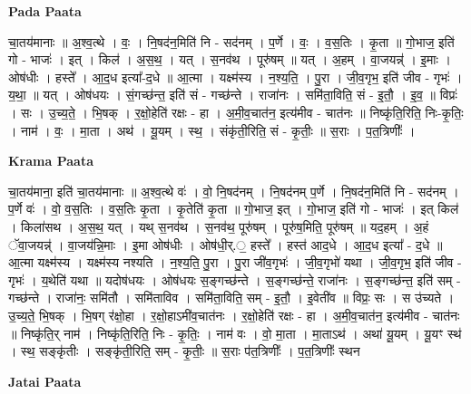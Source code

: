 \documentclass[17pt]{extarticle}
\begin{document}
\textbf{Pada Paata} \newline

चा॒तय॑मानाः ॥ अ॒श्व॒त्थे । वः॒ । नि॒षद॑न॒मिति॑ नि - सद॑नम् । प॒र्णे । वः॒ । व॒स॒तिः । कृ॒ता ॥ गो॒भाज॒ इति॑ गो - भाजः॑ । इत् । किल॑ । अ॒स॒थ॒ । यत् । स॒नव॑थ । पूरु॑षम् ॥ यत् । अ॒हम् । वा॒जयन्न्॑ । इ॒माः । ओष॑धीः । हस्ते᳚ । आ॒द॒ध इत्या᳚-द॒धे ॥ आ॒त्मा । यक्ष्म॑स्य । न॒श्य॒ति॒ । पु॒रा । जी॒व॒गृभ॒ इति॑ जीव - गृभः॑ । य॒था॒ ॥ यत् । ओष॑धयः । सं॒गच्छ॑न्त॒ इति॑ सं - गच्छ॑न्ते । राजा॑नः । समि॑ता॒विति॒ सं - इ॒तौ॒ । इ॒व॒ ॥ विप्रः॑ । सः । उ॒च्य॒ते॒ । भि॒षक् । र॒क्षो॒हेति॑ रक्षः - हा । अ॒मी॒व॒चात॑न॒ इत्य॑मीव - चात॑नः ॥ निष्कृ॑ति॒रिति॒ निः-कृ॒तिः॒ । नाम॑ । वः॒ । मा॒ता । अथ॑ । यू॒यम् । स्थ॒ । संकृ॑ती॒रिति॒ सं - कृ॒तीः॒ ॥ स॒राः । प॒त॒त्रिणीः᳚ ।  \newline


\textbf{Krama Paata} \newline

चा॒तय॑माना॒ इति॑ चा॒तय॑मानाः ॥ अ॒श्व॒त्थे वः॑ । वो॒ नि॒षद॑नम् । नि॒षद॑नम् प॒र्णे । नि॒षद॑न॒मिति॑ नि - सद॑नम् । प॒र्णे वः॑ । वो॒ व॒स॒तिः । व॒स॒तिः कृ॒ता । कृ॒तेति॑ कृ॒ता ॥ गो॒भाज॒ इत् । गो॒भाज॒ इति॑ गो - भाजः॑ । इत् किल॑ । किला॑सथ । अ॒स॒थ॒ यत् । यथ् स॒नव॑थ । स॒नव॑थ॒ पूरु॑षम् । पूरु॑ष॒मिति॒ पूरु॑षम् ॥ यद॒हम् । अ॒हं ॅवा॒जयन्न्॑ । वा॒जय॑न्नि॒माः । इ॒मा ओष॑धीः । ओष॑धी॒र्.॒ हस्ते᳚ । हस्त॑ आद॒धे । आ॒द॒ध इत्या᳚ - द॒धे ॥ आ॒त्मा यक्ष्म॑स्य । यक्ष्म॑स्य नश्यति । न॒श्य॒ति॒ पु॒रा । पु॒रा जी॑व॒गृभः॑ । जी॒व॒गृभो॑ यथा । जी॒व॒गृभ॒ इति॑ जीव - गृभः॑ । य॒थेति॑ यथा ॥ यदोष॑धयः । ओष॑धयः स॒ङ्गच्छ॑न्ते । स॒ङ्गच्छ॑न्ते॒ राजा॑नः । स॒ङ्गच्छ॑न्त॒ इति॑ सम् - गच्छ॑न्ते । राजा॑नः॒ समि॑तौ । समि॑ताविव । समि॑ता॒विति॒ सम् - इ॒तौ॒ । इ॒वेती॑व ॥ विप्रः॒ सः । स उ॑च्यते । उ॒च्य॒ते॒ भि॒षक् । भि॒षग् र॑क्षो॒हा । र॒क्षो॒हाऽमी॑व॒चात॑नः । र॒क्षो॒हेति॑ रक्षः - हा । अ॒मी॒व॒चात॑न॒ इत्य॑मीव - चात॑नः ॥ निष्कृ॑ति॒र् नाम॑ । निष्कृ॑ति॒रिति॒ निः - कृ॒तिः॒ । नाम॑ वः । वो॒ मा॒ता । मा॒ताऽथ॑ । अथा॑ यू॒यम् । यू॒यꣳ स्थ॑ । स्थ॒ सङ्कृ॑तीः । सङ्कृ॑ती॒रिति॒ सम् - कृ॒तीः॒ ॥ स॒राः प॑त॒त्रिणीः᳚ । प॒त॒त्रिणीः᳚ स्थन \newline

\textbf{Jatai Paata} \newline
\end{document}
